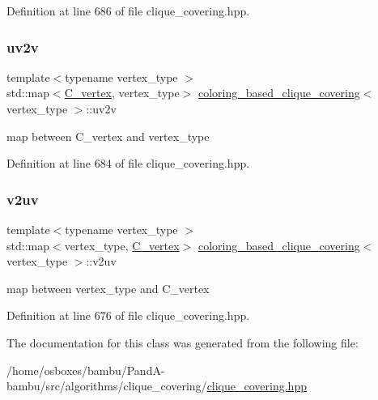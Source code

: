 Definition at line 686 of file clique\+\_\+covering.\+hpp.

\mbox{\label{classcoloring__based__clique__covering_a6a914b034e1c0c21e73709a0afd478ab}} 
\subsubsection{\texorpdfstring{uv2v}{uv2v}}
{\footnotesize\ttfamily template$<$typename vertex\+\_\+type $>$ \\
std\+::map$<$\hyperlink{clique__covering__graph_8hpp_a9cb45047ea8c5ed95a8cfa90494345aa}{C\+\_\+vertex}, vertex\+\_\+type$>$ \hyperlink{classcoloring__based__clique__covering}{coloring\+\_\+based\+\_\+clique\+\_\+covering}$<$ vertex\+\_\+type $>$\+::uv2v\hspace{0.3cm}{\ttfamily [protected]}}



map between C\+\_\+vertex and vertex\+\_\+type 



Definition at line 684 of file clique\+\_\+covering.\+hpp.

\mbox{\label{classcoloring__based__clique__covering_ab8dea13e2a517759b34e3684b105b67f}} 
\subsubsection{\texorpdfstring{v2uv}{v2uv}}
{\footnotesize\ttfamily template$<$typename vertex\+\_\+type $>$ \\
std\+::map$<$vertex\+\_\+type, \hyperlink{clique__covering__graph_8hpp_a9cb45047ea8c5ed95a8cfa90494345aa}{C\+\_\+vertex}$>$ \hyperlink{classcoloring__based__clique__covering}{coloring\+\_\+based\+\_\+clique\+\_\+covering}$<$ vertex\+\_\+type $>$\+::v2uv\hspace{0.3cm}{\ttfamily [private]}}



map between vertex\+\_\+type and C\+\_\+vertex 



Definition at line 676 of file clique\+\_\+covering.\+hpp.



The documentation for this class was generated from the following file\+:\begin{DoxyCompactItemize}
\item 
/home/osboxes/bambu/\+Pand\+A-\/bambu/src/algorithms/clique\+\_\+covering/\hyperlink{clique__covering_8hpp}{clique\+\_\+covering.\+hpp}\end{DoxyCompactItemize}
